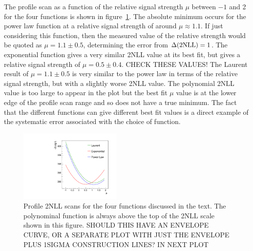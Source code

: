 The profile scan as a function of the relative signal strength $\mu$
between $-1$ and 2
for the four functions is shown in
figure~\ref{fig:functions:profiles}.
The absolute minimum occurs for the power law function at a relative signal 
strength of around $\mu \approx 1.1$. If just considering this function,
then the measured value of the relative strength would be quoted as
$\mu = 1.1 \pm 0.5$, determining the error from $\Delta({\rm 2NLL}) = 1$.
The exponential function gives a very similar 2NLL value
at its best fit, but gives a relative signal strength of $\mu = 0.5 \pm 0.4$.
CHECK THESE VALUES!
The Laurent result of $\mu = 1.1 \pm 0.5$
is very similar to the power law in terms of the
relative signal strength, but with a slightly
worse 2NLL value. The polynomial 2NLL value is too large to appear in the plot
but the best fit $\mu$ value is at the lower edge of the profile scan range
and so does not have a true minimum.
The fact that the different functions can give different best fit values
is a direct example of the systematic error associated
with the choice of function.
%
\begin{figure}[tbp]
\centering
\includegraphics[width=0.45\textwidth]{functions/Profiles.pdf}
\caption{Profile 2NLL scans for the four functions discussed in the text.
The polynominal function is always above the top of the 2NLL scale shown in this
figure. SHOULD THIS HAVE AN ENVELOPE CURVE, OR A SEPARATE PLOT WITH JUST
THE ENVELOPE PLUS 1SIGMA CONSTRUCTION LINES? IN NEXT PLOT}
\label{fig:functions:profiles}
\end{figure}

